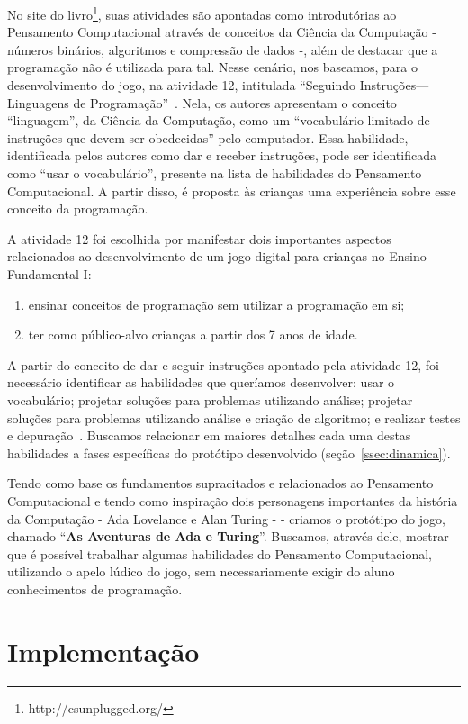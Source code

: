 No site do livro\footnote{http://csunplugged.org/}, suas atividades são apontadas como introdutórias ao Pensamento Computacional através de conceitos da Ciência da Computação - números binários, algoritmos e compressão de dados -, além de destacar que a programação não é utilizada para tal. Nesse cenário, nos baseamos, para o desenvolvimento do jogo, na atividade 12, intitulada “Seguindo Instruções—Linguagens de Programação”~\cite[~p.101]{bell_computer_2011}. Nela, os autores apresentam o conceito “linguagem”, da Ciência da Computação, como um “vocabulário limitado de instruções que devem ser obedecidas” pelo computador. Essa habilidade, identificada pelos autores como dar e receber instruções, pode ser identificada como “usar o vocabulário”, presente na lista de habilidades do Pensamento Computacional. A partir disso, é proposta às crianças uma experiência sobre esse conceito da programação.

A atividade 12 foi escolhida por manifestar dois importantes aspectos relacionados ao desenvolvimento de um jogo digital para crianças no Ensino Fundamental I:

\begin{enumerate}
	\item ensinar conceitos de programação sem utilizar a programação em si;
	\item ter como público-alvo crianças a partir dos 7 anos de idade.
\end{enumerate}

A partir do conceito de dar e seguir instruções apontado pela atividade 12, foi necessário identificar as habilidades que queríamos desenvolver: usar o vocabulário; projetar soluções para problemas utilizando análise; projetar soluções para problemas utilizando análise e criação de algoritmo; e realizar testes e depuração~\cite{barr_bringing_2011}. Buscamos relacionar em maiores detalhes cada uma destas habilidades a fases específicas do protótipo desenvolvido (seção~\ref{ssec:dinamica}).

Tendo como base os fundamentos supracitados e relacionados ao Pensamento Computacional e tendo como inspiração dois personagens importantes da história da Computação - Ada Lovelance e Alan Turing - - criamos o protótipo do jogo, chamado “\textbf{As Aventuras de Ada e Turing}”. Buscamos, através dele, mostrar que é possível trabalhar algumas habilidades do Pensamento Computacional, utilizando o apelo lúdico do jogo, sem necessariamente exigir do aluno conhecimentos de programação.

\section{Implementação} \label{sec:implementacao}

